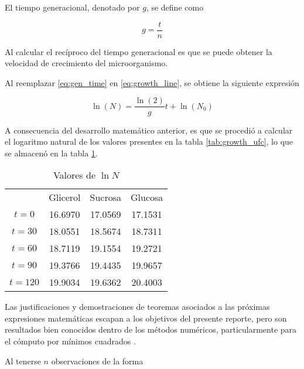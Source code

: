 El tiempo generacional, denotado por $g$, se define como

\begin{equation}
  g = \frac{t}{n}
  \label{eq:gen_time}
\end{equation}

Al calcular el recíproco del tiempo generacional es que se puede obtener la velocidad de crecimiento del microorganismo. 

Al reemplazar \eqref{eq:gen_time} en \eqref{eq:growth_line}, se obtiene la siguiente expresión

\begin{equation}
  \ln(N) = \frac{\ln(2)}{g} t + \ln(N_0)
\end{equation}

A consecuencia del desarrollo matemático anterior, es que se procedió a calcular el logaritmo natural de los valores presentes en la tabla \ref{tab:growth_ufc}, lo que se almacenó en la tabla \ref{tab:growth_log}.

\begin{table}[H]
  \centering
  \begin{tabular}{cccc}\toprule
    & Glicerol & Sucrosa & Glucosa \\ \cmidrule{2-4}
    $t=0$ & 16.6970 & 17.0569 & 17.1531 \\ 
    $t=30$ & 18.0551 & 18.5674 & 18.7311 \\ 
    $t=60$ & 18.7119 & 19.1554 & 19.2721 \\ 
    $t=90$ & 19.3766 & 19.4435 & 19.9657 \\ 
    $t=120$ & 19.9034 & 19.6362 & 20.4003 \\ \bottomrule
  \end{tabular}
  \caption{Valores de $\ln N$}
  \label{tab:growth_log}
\end{table}

Las justificaciones y demostraciones de teoremas asociados a las próximas expresiones matemáticas escapan a los objetivos del presente reporte, pero son resultados bien conocidos dentro de los métodos numéricos, particularmente para el cómputo por mínimos cuadrados \parencite{chapra2015}.

Al tenerse $n$ observaciones de la forma 

